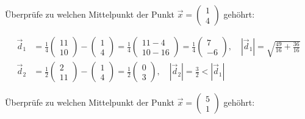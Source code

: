 \documentclass[11pt]{article}
\begin{document}
Überprüfe zu welchen Mittelpunkt der Punkt
\(\vec{x} = \begin{pmatrix} 1 \\ 4 \end{pmatrix}\) gehöhrt:

\[\begin{aligned}
\vec{d}_1 &= \frac{1}{4}\begin{pmatrix} 11 \\ 10 \end{pmatrix} -  \begin{pmatrix} 1 \\ 4 \end{pmatrix} =  \frac{1}{4} \begin{pmatrix} 11 - 4 \\ 10 - 16  \end{pmatrix} = \frac{1}{4}\begin{pmatrix} 7 \\ -6 \end{pmatrix}, \quad \left| \vec{d}_1 \right| = \sqrt{\frac{49}{16} + \frac{36}{16}}  \\
\vec{d}_2 &= \frac{1}{2}\begin{pmatrix} 2 \\ 11 \end{pmatrix} -  \begin{pmatrix} 1 \\ 4 \end{pmatrix} =  \frac{1}{2}\begin{pmatrix} 0 \\ 3 \end{pmatrix}, \quad \left| \vec{d}_2 \right| = \frac{3}{2} < \left| \vec{d}_1 \right|
\end{aligned}\]

Überprüfe zu welchen Mittelpunkt der Punkt
\(\vec{x} = \begin{pmatrix} 5 \\ 1 \end{pmatrix}\) gehöhrt:
\end{document}
